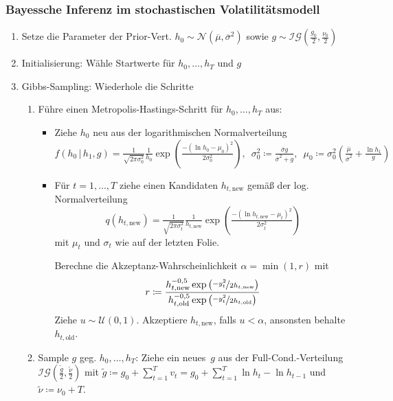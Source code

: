 \documentclass[10pt]{beamer}
\theoremstyle{definition}
\newcommand{\Normal}{\mathcal{N}} %
\newcommand{\Uniform}{\mathcal{U}} %
\newcommand{\InverseGamma}{\mathcal{IG}} %
\newcommand{\new}{\mathrm{new}} %
\newcommand{\old}{\mathrm{old}} %
\newcommand{\stepOne}[1]{\textcolor{StepOneColor}{#1}}
\newcommand{\stepTwo}[1]{\textcolor{StepTwoColor}{#1}}
\begin{document}
\begin{frame}[t]
  \frametitle{Bayessche Inferenz im stochastischen Volatilitätsmodell}
  \begin{enumerate}
    \item<2->[A.] Setze die Parameter der Prior-Vert. $h_0 \sim \Normal(\overline{\mu}, \overline{\sigma}^2)$ sowie $g \sim \InverseGamma(\tfrac{g_0}{2}, \tfrac{\nu_0}{2})$
    \item<3->[B.] Initialisierung: Wähle Startwerte für $h_0, \ldots, h_T$ und $g$
    \item<4->[C.] Gibbs-Sampling: Wiederhole die Schritte
    \begin{enumerate}
      \item<5->[\stepOne{1.}] Führe einen Metropolis-Hastings-Schritt für \stepOne{$h_0, \ldots, h_T$} aus:
      \begin{itemize}
        \item<6-> Ziehe $h_0$ neu aus der logarithmischen Normalverteilung
        \[
          f(h_0 \,|\, h_1, g) = \tfrac{1}{\sqrt{2 \pi \sigma_0^2}} \tfrac{1}{h_0} \exp \left( \tfrac{- (\ln h_0 - \mu_0)^2}{2 \sigma_0^2} \right), \enspace
          \sigma_0^2 \coloneqq \tfrac{\overline{\sigma} g}{\overline{\sigma}^2 + g}, \enspace
          \mu_0 \coloneqq \sigma_0^2 \left( \tfrac{\overline{\mu}}{\overline{\sigma}^2} + \tfrac{\ln h_1}{g} \right)
        \]
        \item<7-> Für $t = 1, \ldots, T$ ziehe einen Kandidaten $h_{t, \new}$ gemäß der log. Normalverteilung
        \[
          q(h_{t,\new}) = \tfrac{1}{\sqrt{2 \pi \sigma_t^2}} \tfrac{1}{h_{t, \new}} \exp \left( \tfrac{- (\ln h_{t, \new} - \mu_t)^2}{2 \sigma_t^2} \right)
        \]
        mit $\mu_t$ und $\sigma_t$ wie auf der letzten Folie.

        Berechne die Akzeptanz-Wahrscheinlichkeit $\alpha = \min(1, r)$ mit
        \[
          r \coloneqq \frac{h_{t,\new}^{-0,5} \exp \left( \nicefrac{-y_t^2}{2 h_{t, \new}} \right)}{h_{t,\old}^{-0,5} \exp \left( \nicefrac{-y_t^2}{2 h_{t, \old}} \right)}
        \]
        Ziehe $u \sim \Uniform(0,1)$. Akzeptiere $h_{t, \new}$, falls $u < \alpha$, ansonsten behalte $h_{t, \old}$.
      \end{itemize}
      \item<8->[\stepTwo{2.}] Sample \stepTwo{$g$} geg. \stepOne{$h_0, \ldots, h_T$}:
      Ziehe ein neues~$g$ aus der Full-Cond.-Verteilung $\InverseGamma(\tfrac{\tilde{g}}{2}, \tfrac{\tilde{\nu}}{2})$ mit $\tilde{g} \coloneqq g_0 + \sum_{t=1}^T v_t = g_0 + \sum_{t=1}^T \ln h_t - \ln h_{t-1}$ und $\tilde{\nu} \coloneqq \nu_0 + T$.
    \end{enumerate}
  \end{enumerate}
\end{frame}
\end{document}
